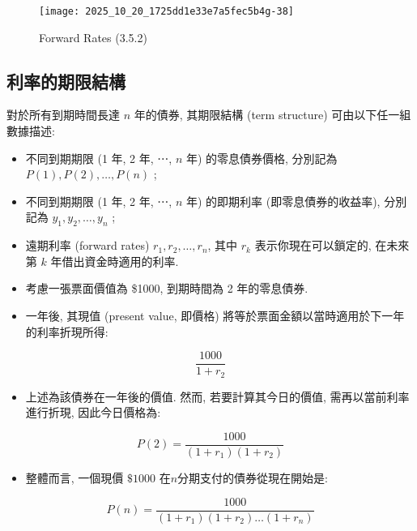 \documentclass[letterpaper]{article}
\begin{document}
		
		\begin{figure}[h]
			\begin{center}
				\caption{Forward Rates  (3.5.2) }
				\texttt{[image: 2025\_10\_20\_1725dd1e33e7a5fec5b4g-38]}
			\end{center}
		\end{figure}
		
		\subsection{利率的期限結構 }
		對於所有到期時間長達 \( n \) 年的債券, 其期限結構 (term structure) 可由以下任一組數據描述: 
		
		\begin{itemize}
			\item 不同到期期限 (1 年, 2 年, ⋯, \( n \) 年) 的零息債券價格, 分別記為 \( P (1), P (2), \ldots, P (n) \) ; 
			\item 不同到期期限 (1 年, 2 年, ⋯, \( n \) 年) 的即期利率 (即零息債券的收益率), 分別記為 \( y_{1}, y_{2}, \ldots, y_{n} \) ; 
			\item 遠期利率 (forward rates) \( r_{1}, r_{2}, \ldots, r_{n} \), 其中 \( r_{k} \) 表示你現在可以鎖定的, 在未來第 \( k \) 年借出資金時適用的利率.  
		\end{itemize}
		
		
		\begin{itemize}
			\item 考慮一張票面價值為 \$1000, 到期時間為 2 年的零息債券.  
			\item 一年後, 其現值 (present value, 即價格) 將等於票面金額以當時適用於下一年的利率折現所得: 
		\end{itemize}
		
		
		$$
		\frac{1000}{1+r_{2}}
		$$
		
		\begin{itemize}
			\item 上述為該債券在一年後的價值.  然而, 若要計算其今日的價值, 需再以當前利率進行折現, 因此今日價格為: 
		\end{itemize}
		
		$$
		P (2) =\frac{1000}{\left (1+r_{1}\right) \left (1+r_{2}\right) }
		$$
		
		\begin{itemize}
			\item 整體而言, 一個現價 $\$ 1000$ 在$n$分期支付的債券從現在開始是: 
		\end{itemize}
		
		$$
		P (n) =\frac{1000}{\left (1+r_{1}\right) \left (1+r_{2}\right) \ldots\left (1+r_{n}\right) }
		$$
		
\end{document}
